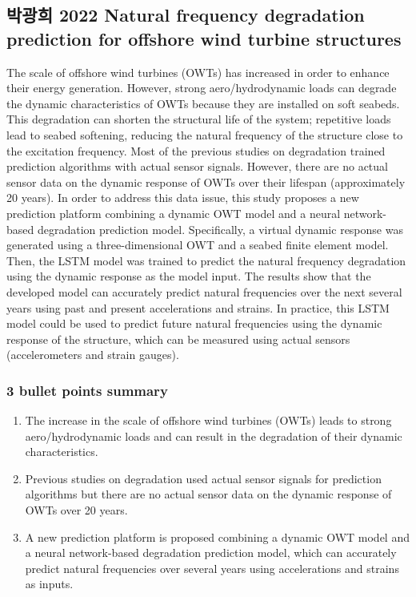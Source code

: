 \documentclass[
  letterpaper,
  DIV=11,
  numbers=noendperiod]{scrreprt}
\providecommand{\tightlist}{%
  \setlength{\itemsep}{0pt}\setlength{\parskip}{0pt}}\usepackage{longtable,booktabs,array}
\begin{document}
\hypertarget{uxbc15uxad11uxd76c-2022-natural-frequency-degradation-prediction-for-offshore-wind-turbine-structures}{%
\subsection{박광희 2022 Natural frequency degradation prediction for
offshore wind turbine
structures}\label{uxbc15uxad11uxd76c-2022-natural-frequency-degradation-prediction-for-offshore-wind-turbine-structures}}

The scale of offshore wind turbines (OWTs) has increased in order to
enhance their energy generation. However, strong aero/hydrodynamic loads
can degrade the dynamic characteristics of OWTs because they are
installed on soft seabeds. This degradation can shorten the structural
life of the system; repetitive loads lead to seabed softening, reducing
the natural frequency of the structure close to the excitation
frequency. Most of the previous studies on degradation trained
prediction algorithms with actual sensor signals. However, there are no
actual sensor data on the dynamic response of OWTs over their lifespan
(approximately 20 years). In order to address this data issue, this
study proposes a new prediction platform combining a dynamic OWT model
and a neural network-based degradation prediction model. Specifically, a
virtual dynamic response was generated using a three-dimensional OWT and
a seabed finite element model. Then, the LSTM model was trained to
predict the natural frequency degradation using the dynamic response as
the model input. The results show that the developed model can
accurately predict natural frequencies over the next several years using
past and present accelerations and strains. In practice, this LSTM model
could be used to predict future natural frequencies using the dynamic
response of the structure, which can be measured using actual sensors
(accelerometers and strain gauges).

\hypertarget{bullet-points-summary-11}{%
\subsubsection{3 bullet points summary}\label{bullet-points-summary-11}}

\begin{enumerate}
\def\labelenumi{\arabic{enumi}.}
\tightlist
\item
  The increase in the scale of offshore wind turbines (OWTs) leads to
  strong aero/hydrodynamic loads and can result in the degradation of
  their dynamic characteristics.
\item
  Previous studies on degradation used actual sensor signals for
  prediction algorithms but there are no actual sensor data on the
  dynamic response of OWTs over 20 years.
\item
  A new prediction platform is proposed combining a dynamic OWT model
  and a neural network-based degradation prediction model, which can
  accurately predict natural frequencies over several years using
  accelerations and strains as inputs.
\end{enumerate}
\end{document}
